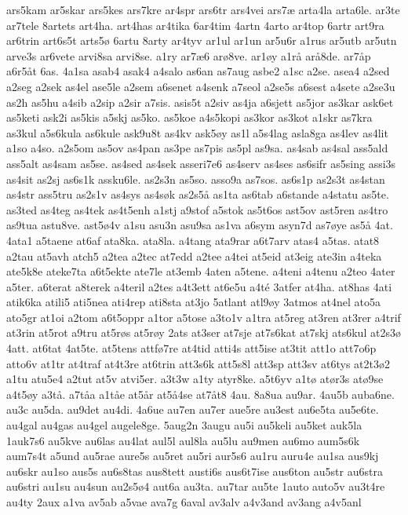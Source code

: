 {ars5kam
ar5skar
ars5kes
ars7kre
ar4spr
ars6tr
ars4vei
ars7æ
arta4la
arta6le.
ar3te
ar7tele
8artets
art4ha.
art4has
ar4tika
6ar4tim
4artn
4arto
ar4top
6artr
art9ra
ar6trin
art6s5t
arts5ø
6artu
8arty
ar4tyv
ar1ul
ar1un
ar5u6r
a1rus
ar5utb
ar5utn
arve3s
ar6vete
arvi8sa
arvi8se.
a1ry
ar7æ6
arø8ve.
ar1øy
a1rå
arå8de.
ar7åp
a6r5åt
6as.
4a1sa
asab4
asak4
a4salo
as6an
as7aug
asbe2
a1sc
a2se.
asea4
a2sed
a2seg
a2sek
as4el
ase5le
a2sem
a6senet
a4senk
a7seol
a2se5s
a6sest
a4sete
a2se3u
as2h
as5hu
a4sib
a2sip
a2sir
a7sis.
asis5t
a2siv
as4ja
a6sjett
as5jor
as3kar
ask6et
as5keti
ask2i
as5kis
a5skj
as5ko.
as5koe
a4s5kopi
as3kor
as3kot
a1skr
as7kra
as3kul
a5s6kula
as6kule
ask9u8t
as4kv
ask5øy
as1l
a5s4lag
asla8ga
as4lev
as4lit
a1so
a4so.
a2s5om
as5ov
as4pan
as3pe
as7pis
as5pl
as9sa.
as4sab
as4sal
ass5ald
ass5alt
as4sam
as5se.
as4sed
as4sek
asseri7e6
as4serv
as4ses
as6sifr
as5sing
assi3s
as4sit
as2sj
as6s1k
assku6le.
as2s3n
as5so.
asso9a
as7sos.
as6s1p
as2s3t
as4stan
as4str
ass5tru
as2s1v
as4sys
as4søk
as2s5å
as1ta
as6tab
a6stande
a4statu
as5te.
as3ted
as4teg
as4tek
as4t5enh
a1stj
a9stof
a5stok
as5t6os
ast5ov
ast5ren
as4tro
as9tua
astu8ve.
ast5ø4v
a1su
asu3n
asu9sa
as1va
a6sym
asyn7d
as7øye
as5å
4at.
4ata1
a5taene
at6af
ata8ka.
ata8la.
a4tang
ata9rar
a6t7arv
atas4
a5tas.
atat8
a2tau
at5avh
atch5
a2tea
a2tec
at7edd
a2tee
a4tei
at5eid
at3eig
ate3in
a4teka
ate5k8e
ateke7ta
a6t5ekte
ate7le
at3emb
4aten
a5tene.
a4teni
a4tenu
a2teo
4ater
a5ter.
a6terat
a8terek
a4teril
a2tes
a4t3ett
at6e5u
a4té
3atfer
at4ha.
at8has
4ati
atik6ka
atili5
ati5nea
ati4rep
ati8sta
at3jo
5atlant
atl9øy
3atmos
at4nel
ato5a
ato5gr
at1oi
a2tom
a6t5oppr
a1tor
a5tose
a3to1v
a1tra
at5reg
at3ren
at3rer
a4trif
at3rin
at5rot
a9tru
at5røs
at5røy
2ats
at3ser
at7sje
at7s6kat
at7skj
ats6kul
at2s3ø
4att.
at6tat
4at5te.
at5tens
attfø7re
at4tid
atti4s
att5ise
at3tit
att1o
att7o6p
atto6v
at1tr
at4traf
at4t3re
at6trin
att3s6k
att5s8l
att3sp
att3sv
at6tys
at2t3ø2
a1tu
atu5e4
a2tut
at5v
atvi5er.
a3t3w
a1ty
atyr8ke.
a5t6yv
a1tø
atør3s
atø9se
a4t5øy
a3tå.
a7tåa
a1tåe
at5år
at5å4se
at7åt8
4au.
8a8ua
au9ar.
4au5b
auba6ne.
au3c
au5da.
au9det
au4di.
4a6ue
au7en
au7er
aue5re
au3est
au6e5ta
au5e6te.
au4gal
au4gas
au4gel
augele8ge.
5aug2n
3augu
au5i
au5keli
au5ket
auk5la
1auk7s6
au5kve
au6las
au4lat
aul5l
aul8la
au5lu
au9men
au6mo
aum5s6k
aum7s4t
a5und
au5rae
aure5s
au5ret
au5ri
aur5s6
au1ru
auru4e
au1sa
aus9kj
au6skr
au1so
aus5s
au6s8tas
aus8tett
austi6s
aus6t7ise
aus6ton
au5str
au6stra
au6stri
au1su
au4sun
au2s5ø4
aut6a
au3ta.
au7tar
au5te
1auto
auto5v
au3t4re
au4ty
2aux
a1va
av5ab
a5vae
ava7g
6aval
av3alv
a4v3and
av3ang
a4v5anl
}
